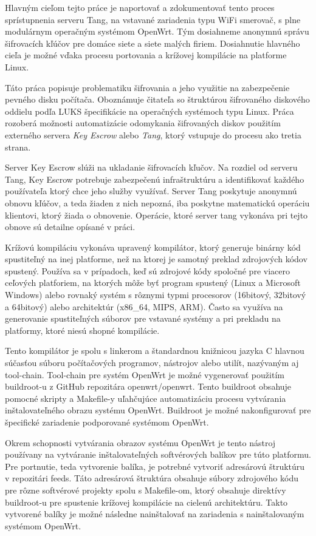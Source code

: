 Hlavným cieľom tejto práce je naportovať a zdokumentovať tento proces sprístupnenia serveru Tang, na vstavané zariadenia typu WiFi smerovač, s plne modulárnym operačným systémom OpenWrt.
Tým dosiahneme anonymnú správu šifrovacích kľúčov pre domáce siete a siete malých firiem.
Dosiahnutie hlavného cieľa je možné vďaka procesu portovania a krížovej kompilácie na platforme Linux.

Táto práca popisuje problematiku šifrovania a jeho využitie na zabezpečenie pevného disku počítača.
Oboznámuje čitateľa so štruktúrou šifrovaného diskového oddielu podľa LUKS špecifikácie na operačných systémoch typu Linux.
Práca rozoberá možnosti automatizácie odomykania šifrovaných diskov použitím externého servera {\it Key Escrow} alebo {\it Tang}, ktorý vstupuje do procesu ako tretia strana.

Server Key Escrow slúži na ukladanie šifrovacích kľučov.
Na rozdiel od serveru Tang, Key Escrow potrebuje zabezpečenú infraštruktúru a identifikovať každého používateľa ktorý chce jeho služby využívať.
Server Tang poskytuje anonymnú obnovu kľúčov, a teda žiaden z nich nepozná, iba poskytne matematickú operáciu klientovi, ktorý žiada o obnovenie.
Operácie, ktoré server tang vykonáva pri tejto obnove sú detailne opísané v práci.

Krížovú kompiláciu vykonáva upravený kompilátor, ktorý generuje binárny kód spustiteľný na inej platforme, než na ktorej je samotný preklad zdrojových kódov spustený.
Používa sa v prípadoch, keď sú zdrojové kódy spoločné pre viacero ceľových platforiem, na ktorých môže byť program spustený (Linux a Microsoft Windows) alebo rovnaký systém s rôznymi typmi procesorov (16bitový, 32bitový a 64bitový) alebo architektúr (x86\_64, MIPS, ARM).
Často sa využíva na generovanie spustiteľných súborov pre vstavané systémy a pri prekladu na platformy, ktoré niesú shopné kompilácie.

Tento kompilátor je spolu s linkerom a štandardnou knižnicou jazyka C hlavnou súčasťou súboru počítačových programov, nástrojov alebo utilít, nazývaným aj tool-chain.
Tool-chain pre systém OpenWrt je možné vygenerovať použitím buildroot-u z GitHub repozitára openwrt/openwrt.
Tento buildroot obsahuje pomocné skripty a Makefile-y uľahčujúce automatizáciu procesu vytvárania inštalovateľného obrazu systému OpenWrt.
Buildroot je možné nakonfigurovať pre špecifické zariadenie podporované systémom OpenWrt.

Okrem schopnosti vytvárania obrazov systému OpenWrt je tento nástroj používany na vytváranie inštalovateľných softvérových balíkov pre túto platformu.
Pre portnutie, teda vytvorenie balíka, je potrebné vytvoriť adresárovú štruktúru v repozitári feeds.
Táto adresárová štruktúra obsahuje súbory zdrojového kódu pre rôzne softvérové projekty spolu s Makefile-om, ktorý obsahuje direktívy buildroot-u pre spustenie krížovej kompilácie na cielenú architektúru.
Takto vytvorené balíky je možné následne nainštalovať na zariadenia s nainštalovaným systémom OpenWrt.

